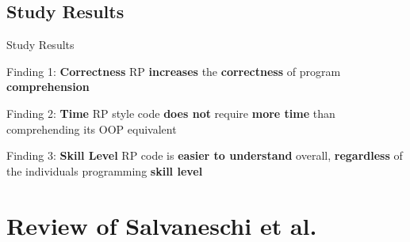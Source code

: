 \documentclass{beamer}
\begin{document}
\subsection*{Study Results}
\begin{frame}{Study Results}
	\begin{block}{Finding 1: \textbf{Correctness}}
		RP \textbf{increases} the \textbf{correctness} of program \textbf{comprehension}
	\end{block}
	\begin{block}{Finding 2: \textbf{Time}}
		RP style code \textbf{does not} require \textbf{more time} than comprehending its OOP equivalent
	\end{block}
	\begin{block}{Finding 3: \textbf{Skill Level}}
		RP code is \textbf{easier to understand} overall, \textbf{regardless} of the individuals programming \textbf{skill level}
	\end{block}
\end{frame}



\section{Review of Salvaneschi et al.}
\end{document}
